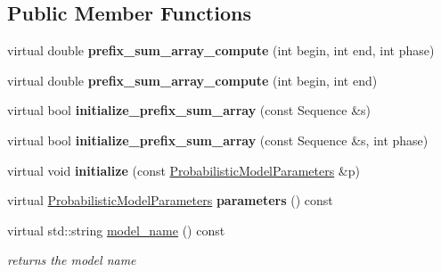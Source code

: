\subsection*{Public Member Functions}
\begin{DoxyCompactItemize}
\item 
\mbox{\label{classtops_1_1MultipleSequentialModel_a7929d648f8f2f1cdecb0ac7e03298519}} 
virtual double {\bfseries prefix\+\_\+sum\+\_\+array\+\_\+compute} (int begin, int end, int phase)
\item 
\mbox{\label{classtops_1_1MultipleSequentialModel_a9dd8a61e7e9ac823fe7557b13fce160e}} 
virtual double {\bfseries prefix\+\_\+sum\+\_\+array\+\_\+compute} (int begin, int end)
\item 
\mbox{\label{classtops_1_1MultipleSequentialModel_a122a00bbf110019a7867525a2cb77b86}} 
virtual bool {\bfseries initialize\+\_\+prefix\+\_\+sum\+\_\+array} (const Sequence \&s)
\item 
\mbox{\label{classtops_1_1MultipleSequentialModel_aa53c8e2233d9854b40bd0c0fb966262b}} 
virtual bool {\bfseries initialize\+\_\+prefix\+\_\+sum\+\_\+array} (const Sequence \&s, int phase)
\item 
\mbox{\label{classtops_1_1MultipleSequentialModel_adff3ab9747c56c23c1f1d3e9d8c519f4}} 
virtual void {\bfseries initialize} (const \hyperlink{classtops_1_1ProbabilisticModelParameters}{Probabilistic\+Model\+Parameters} \&p)
\item 
\mbox{\label{classtops_1_1MultipleSequentialModel_a4b01a6551dd705bf0f68b6cd4ed792cd}} 
virtual \hyperlink{classtops_1_1ProbabilisticModelParameters}{Probabilistic\+Model\+Parameters} {\bfseries parameters} () const
\item 
\mbox{\label{classtops_1_1MultipleSequentialModel_a5c54fa88e2abe4df49939f46368a9b71}} 
virtual std\+::string \hyperlink{classtops_1_1MultipleSequentialModel_a5c54fa88e2abe4df49939f46368a9b71}{model\+\_\+name} () const
\begin{DoxyCompactList}\small\item\em returns the model name \end{DoxyCompactList}\item 

\end{DoxyCompactItemize}

